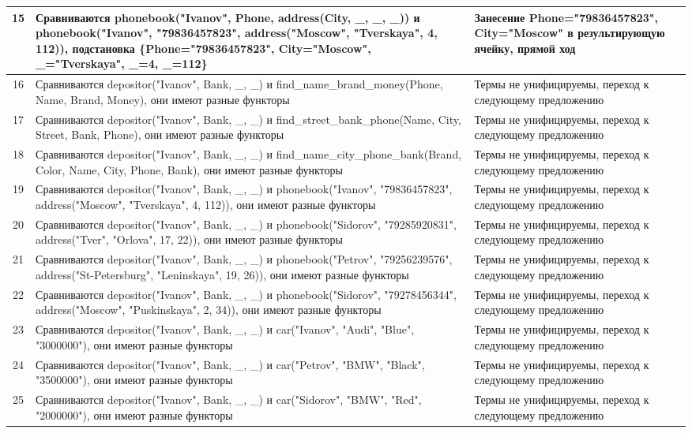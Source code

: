 \documentclass[a4paper,12pt]{article}
\begin{document}
\newpage
\begin{table}[ht!] 
	\begin{tabularx}{\linewidth}{|c|>{\centering}X|>{\centering}X|}
		\hline
		15 & Сравниваются phonebook("Ivanov"{}, Phone, address(City, \_, \_, \_)) и phonebook("Ivanov"{}, "79836457823"{}, address("Moscow"{}, "Tverskaya"{}, 4, 112)), подстановка \{Phone="79836457823"{}, City="Moscow"{}, \_="Tverskaya"{}, \_=4, \_=112\} & Занесение Phone="79836457823"{}, City="Moscow"{} в результирующую ячейку, прямой ход\tabularnewline
		\hline
		16 & Сравниваются depositor("Ivanov"{}, Bank, \_, \_) и find\_name\_brand\_money(Phone, Name, Brand, Money), они имеют разные функторы & Термы не унифицируемы, переход к следующему предложению \tabularnewline
		\hline
		17 & Сравниваются depositor("Ivanov"{}, Bank, \_, \_) и find\_street\_bank\_phone(Name, City, Street, Bank, Phone), они имеют разные функторы & Термы не унифицируемы, переход к следующему предложению \tabularnewline
		\hline
		18 & Сравниваются depositor("Ivanov"{}, Bank, \_, \_) и find\_name\_city\_phone\_bank(Brand, Color, Name, City, Phone, Bank), они имеют разные функторы & Термы не унифицируемы, переход к следующему предложению \tabularnewline
		\hline
		19 & Сравниваются depositor("Ivanov"{}, Bank, \_, \_) и phonebook("Ivanov"{}, "79836457823"{}, address("Moscow"{}, "Tverskaya"{}, 4, 112)), они имеют разные функторы & Термы не унифицируемы, переход к следующему предложению \tabularnewline
		\hline
		20 & Сравниваются depositor("Ivanov"{}, Bank, \_, \_) и phonebook("Sidorov"{}, "79285920831"{}, address("Tver"{}, "Orlova"{}, 17, 22)), они имеют разные функторы & Термы не унифицируемы, переход к следующему предложению \tabularnewline
		21 & Сравниваются depositor("Ivanov"{}, Bank, \_, \_) и phonebook("Petrov"{}, "79256239576"{}, address("St-Petersburg"{}, "Leninskaya"{}, 19, 26)), они имеют разные функторы & Термы не унифицируемы, переход к следующему предложению \tabularnewline
		\hline
		22 & Сравниваются depositor("Ivanov"{}, Bank, \_, \_) и phonebook("Sidorov"{}, "79278456344"{}, address("Moscow"{}, "Puskinskaya"{}, 2, 34)), они имеют разные функторы & Термы не унифицируемы, переход к следующему предложению \tabularnewline
		\hline
		23 & Сравниваются depositor("Ivanov"{}, Bank, \_, \_) и car("Ivanov"{}, "Audi"{}, "Blue"{}, "3000000"), они имеют разные функторы & Термы не унифицируемы, переход к следующему предложению \tabularnewline
		\hline
		24 & Сравниваются depositor("Ivanov"{}, Bank, \_, \_) и car("Petrov"{}, "BMW"{}, "Black"{}, "3500000"), они имеют разные функторы & Термы не унифицируемы, переход к следующему предложению \tabularnewline
		\hline
		25 & Сравниваются depositor("Ivanov"{}, Bank, \_, \_) и car("Sidorov"{}, "BMW"{}, "Red"{}, "2000000"), они имеют разные функторы & Термы не унифицируемы, переход к следующему предложению \tabularnewline
		\hline
	\end{tabularx}
\end{table}
\end{document}
